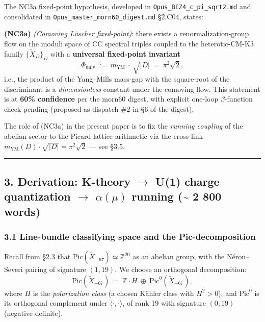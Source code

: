 \documentclass[
  11pt,
  a4paper,
]{article}
\begin{document}
The NC3a fixed-point hypothesis, developed in \texttt{Opus\_BIZ4\_c\_pi\_sqrt2.md} and consolidated in \texttt{Opus\_master\_morn60\_digest.md} §2.C04, states:

\textbf{(NC3a)} \emph{(Comoving Lüscher fixed-point)}: there exists a renormalization-group flow on the moduli space of CC spectral triples coupled to the heterotic-CM-K3 family \(\{\tilde X_D\}_D\) with a \textbf{universal fixed-point invariant}
\[
\Phi_{\mathrm{univ}}\ :=\ m_{\mathrm{YM}}\ \cdot\ \sqrt{|D|}\ =\ \pi^2 \sqrt 2,
\]
i.e., the product of the Yang--Mills mass-gap with the square-root of the discriminant is a \emph{dimensionless} constant under the comoving flow. This statement is at \textbf{60\% confidence} per the morn60 digest, with explicit one-loop \(\beta\)-function check pending (proposed as dispatch \#2 in §6 of the digest).

The role of (NC3a) in the present paper is to fix the \emph{running coupling} of the abelian sector to the Picard-lattice arithmetic via the cross-link \(m_{\mathrm{YM}}(D) \cdot \sqrt{|D|} = \pi^2 \sqrt 2\) --- see §3.5.

\begin{center}\rule{0.5\linewidth}{0.5pt}\end{center}

\hypertarget{derivation-k-theory-to-u1-charge-quantization-to-alphamu-running-2-800-words}{%
\subsection{\texorpdfstring{3. Derivation: K-theory \(\to\) U(1) charge quantization \(\to\) \(\alpha(\mu)\) running (\textasciitilde{} 2 800 words)}{3. Derivation: K-theory \textbackslash to U(1) charge quantization \textbackslash to \textbackslash alpha(\textbackslash mu) running (\textasciitilde{} 2 800 words)}}\label{derivation-k-theory-to-u1-charge-quantization-to-alphamu-running-2-800-words}}

\hypertarget{line-bundle-classifying-space-and-the-pic-decomposition}{%
\subsubsection{3.1 Line-bundle classifying space and the Pic-decomposition}\label{line-bundle-classifying-space-and-the-pic-decomposition}}

Recall from §2.3 that \(\mathrm{Pic}(\tilde X_{-67}) \simeq \mathbb Z^{20}\) as an abelian group, with the Néron--Severi pairing of signature \((1, 19)\). We choose an orthogonal decomposition:
\[
\mathrm{Pic}(\tilde X_{-67})\ =\ \mathbb Z \cdot H\ \oplus\ \mathrm{Pic}^0(\tilde X_{-67}),
\]
where \(H\) is the \emph{polarization class} (a chosen Kähler class with \(H^2 > 0\)), and \(\mathrm{Pic}^0\) is its orthogonal complement under \(\langle\cdot,\cdot\rangle\), of rank 19 with signature \((0, 19)\) (negative-definite).
\end{document}
